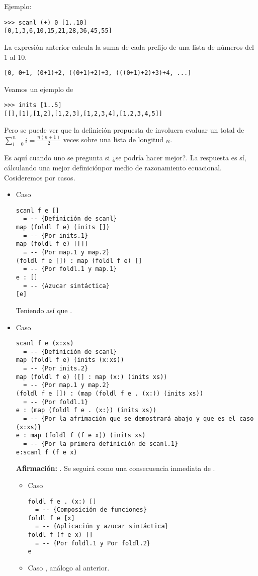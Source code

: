 Ejemplo:
\begin{verbatim}
>>> scanl (+) 0 [1..10]
[0,1,3,6,10,15,21,28,36,45,55]
\end{verbatim}

La expresión anterior calcula la suma de cada prefijo de una lista de números del 1 al 10.
\begin{verbatim}
[0, 0+1, (0+1)+2, ((0+1)+2)+3, (((0+1)+2)+3)+4, ...]
\end{verbatim}

Veamos un ejemplo de 
\begin{verbatim}
>>> inits [1..5]
[[],[1],[1,2],[1,2,3],[1,2,3,4],[1,2,3,4,5]]
\end{verbatim}

Pero se puede ver que la definición propuesta de  involucra evaluar  un
total de $\sum_{i=0}^{n} i = \frac{n(n+1)}{2}$ veces sobre una lista de longitud $n$.

Es aquí cuando uno se pregunta si ¿se podría hacer mejor?. La respuesta es sí, cálculando una mejor
definiciónpor medio de razonamiento ecuacional. Cosideremos por casos.

\begin{itemize}
\item Caso \hsCode{[]}
\begin{verbatim}
scanl f e []
  = -- {Definición de scanl}
map (foldl f e) (inits [])
  = -- {Por inits.1}
map (foldl f e) [[]]
  = -- {Por map.1 y map.2}
(foldl f e []) : map (foldl f e) []
  = -- {Por foldl.1 y map.1}
e : []
  = -- {Azucar sintáctica}
[e]
\end{verbatim}

Teniendo así que .

\item Caso 
\begin{verbatim}
scanl f e (x:xs)
  = -- {Definición de scanl}
map (foldl f e) (inits (x:xs))
  = -- {Por inits.2}
map (foldl f e) ([] : map (x:) (inits xs))
  = -- {Por map.1 y map.2}
(foldl f e []) : (map (foldl f e . (x:)) (inits xs))
  = -- {Por foldl.1}
e : (map (foldl f e . (x:)) (inits xs))
  = -- {Por la afrimación que se demostrará abajo y que es el caso (x:xs)}
e : map (foldl f (f e x)) (inits xs)
  = -- {Por la primera definición de scanl.1}
e:scanl f (f e x)
\end{verbatim}

\textbf{Afirmación:} . Se seguirá como una consecuencia
inmediata de .

\begin{itemize}
\item Caso 
\begin{verbatim}
foldl f e . (x:) []
  = -- {Composición de funciones}
foldl f e [x]
  = -- {Aplicación y azucar sintáctica}
foldl f (f e x) []
  = -- {Por foldl.1 y Por foldl.2}
e
\end{verbatim}

\item Caso , análogo al anterior.
\end{itemize}
\end{itemize}

